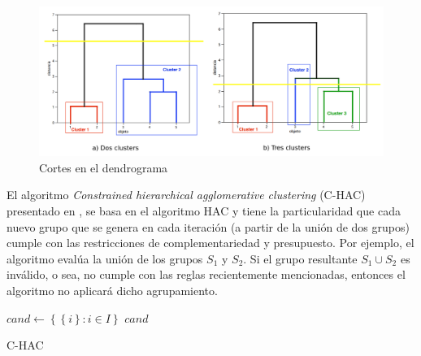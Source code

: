 \begin{figure}[H]
  \centering
    \includegraphics[width=1\textwidth]{img/dendograma02.png}
  \caption{Cortes en el dendrograma}
  \label{nuevaspropuestas:dendograma2}
\end{figure}

El algoritmo \textit{Constrained hierarchical agglomerative clustering} (C-HAC) presentado en \cite{journals/tkde/Amer-YahiaBCFMZ14}, se basa en el algoritmo HAC y tiene la particularidad que cada nuevo grupo que se genera en cada iteración (a partir de la unión de dos grupos) cumple con las restricciones de complementariedad y presupuesto. Por ejemplo, el algoritmo evalúa la unión de los grupos $S_1$ y $S_2$. Si el grupo resultante $S_1 \cup S_2$ es inválido, o sea, no cumple con las reglas recientemente mencionadas, entonces el algoritmo no aplicará dicho agrupamiento.

\begin{center}
	\begin{algorithm}[H]
	\DontPrintSemicolon
	\SetAlgoLined
		$cand \leftarrow \left\{\left\{i\right\}: i \in I\right\}$\; \label{alg:C-HAC:init}
		\Return $cand$\;
	\caption{C-HAC}\label{alg:C-HAC}
	\end{algorithm}
\end{center}

